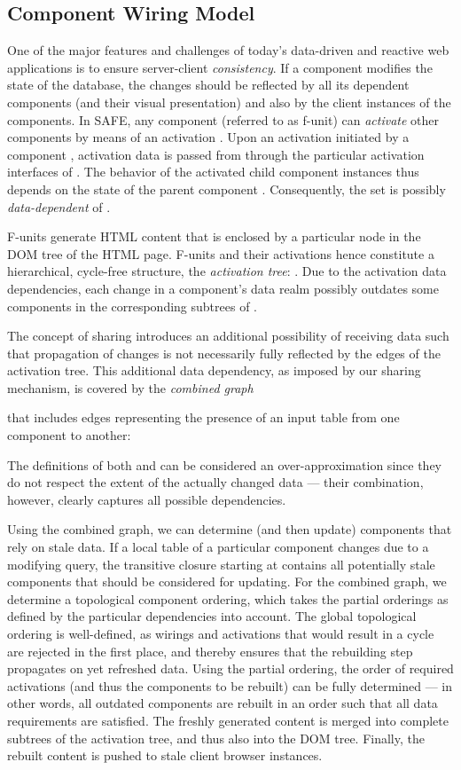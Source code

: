 \documentclass{src/acm_proc_article-sp} \else
\newcommand\SAFE{SAFE\xspace}
\begin{document}
\subsection{Component Wiring Model}

One of the major features and challenges of today's data-driven and
reactive web applications is to ensure server-client \emph{consistency}. If a component
modifies the state of the database, the changes should be reflected
by all its dependent components (and their visual presentation) and also by the client instances of the components.
In \SAFE, any component (referred to as f-unit) can \emph{activate} other components by means of an activation .
Upon an activation initiated by a component , activation data is passed from  through the particular activation interfaces of . The behavior of the activated child component instances thus depends on the state of the parent component . Consequently, the set  is possibly \emph{data-dependent} of .

F-units generate HTML content that is enclosed by a particular
node in the DOM tree of the HTML page. F-units and their
activations hence constitute a hierarchical, cycle-free structure,
the \emph{activation tree}:
.
Due to the activation data dependencies, each change in a component's
data realm possibly outdates some components in the corresponding
subtrees of .

The concept of sharing introduces an additional possibility of
receiving data such that propagation of changes is not necessarily
fully reflected by the edges of the activation tree. This additional
data dependency, as imposed by our sharing mechanism, is covered by
the \emph{combined graph}

that includes edges representing the presence of an input table from
one component to another:


The definitions of both  and  can
be considered an over-approximation since they do not respect the
extent of the actually changed data --- their combination, however,
clearly captures all possible dependencies.

Using the combined graph, we can determine (and then update)
components that rely on stale data. If a local table of a particular
component  changes due to a modifying query, the transitive
closure starting at  contains all potentially stale components
that should be considered for updating. For the combined graph, we
determine a topological component ordering, which takes the partial
orderings as defined by the particular dependencies into account. The
global topological ordering is well-defined, as wirings and
activations that would result in a cycle are rejected in the first
place, and thereby ensures that the rebuilding step propagates on yet
refreshed data. Using the partial ordering, the order of required
activations (and thus the components to be rebuilt) can be fully
determined --- in other words, all outdated components are rebuilt in
an order such that all data requirements are satisfied. The freshly
generated content is merged into complete subtrees of the activation
tree, and thus also into the DOM tree. Finally, the rebuilt content
is pushed to stale client browser instances.
\end{document}
